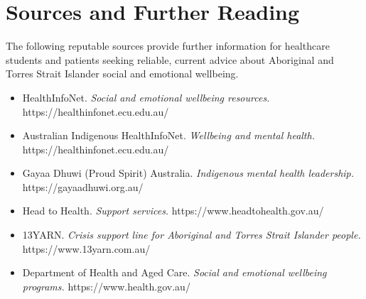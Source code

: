 \section*{Sources and Further Reading}
The following reputable sources provide further information for healthcare students and patients seeking reliable, current advice about Aboriginal and Torres Strait Islander social and emotional wellbeing.
\begin{itemize}
    \item HealthInfoNet. \textit{Social and emotional wellbeing resources.} https://healthinfonet.ecu.edu.au/
    \item Australian Indigenous HealthInfoNet. \textit{Wellbeing and mental health.} https://healthinfonet.ecu.edu.au/
    \item Gayaa Dhuwi (Proud Spirit) Australia. \textit{Indigenous mental health leadership.} https://gayaadhuwi.org.au/
    \item Head to Health. \textit{Support services.} https://www.headtohealth.gov.au/
    \item 13YARN. \textit{Crisis support line for Aboriginal and Torres Strait Islander people.} https://www.13yarn.com.au/
    \item Department of Health and Aged Care. \textit{Social and emotional wellbeing programs.} https://www.health.gov.au/
\end{itemize}
